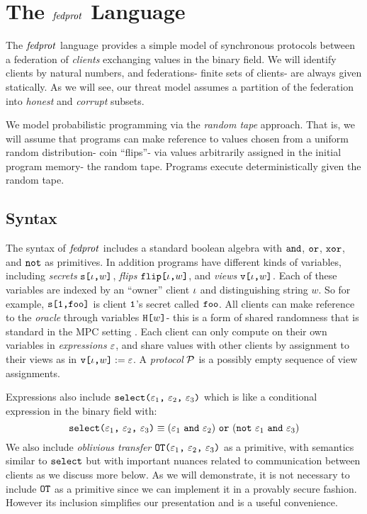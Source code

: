 \section{The $\mathit{fedprot}$ Language}

The $\mathit{fedprot}$ language provides a simple model of synchronous
protocols between a federation of \emph{clients} exchanging values in
the binary field. We will identify clients by natural numbers, and
federations- finite sets of clients- are always given statically.
As we will see, our threat model assumes a partition of the federation
into \emph{honest} and \emph{corrupt} subsets.

We model probabilistic programming via the \emph{random tape}
approach. That is, we will assume that programs can make reference to
values chosen from a uniform random distribution- coin ``flips''- via
values arbitrarily assigned in the initial program memory- the random
tape. Programs execute deterministically given the random tape.

\subsection{Syntax} The syntax of $\mathit{fedprot}$ includes a standard
boolean algebra with $\texttt{and}$, $\texttt{or}$, $\texttt{xor}$, and $\texttt{not}$ as
primitives. In addition programs have different kinds of variables,
including \emph{secrets} $\texttt{s[}\iota\texttt{,}w\texttt{]}$, \emph{flips}
$\texttt{flip[}\iota\texttt{,}w\texttt{]}$, and \emph{views} $\texttt{v[}\iota\texttt{,}w\texttt{]}$.  Each of these
variables are indexed by an ``owner'' client $\iota$ and distinguishing
string $w$. So for example, $\texttt{s[}\texttt{1}\texttt{,}\texttt{foo}\texttt{]}$ is client
$\texttt{1}$'s secret called $\texttt{foo}$. All clients can make reference
to the \emph{oracle} through variables $\texttt{H[}w\texttt{]}$- this is a form
of shared randomness that is standard in the MPC setting \cite{XXX}.
Each client can only compute on their own variables in
\emph{expressions} $\varepsilon$, and share values with other clients by
assignment to their views as in $\texttt{v[}\iota\texttt{,}w\texttt{]} := \varepsilon$.  A
\emph{protocol} $\mathcal{P}$ is a possibly empty sequence of view
assignments.

Expressions also include $\texttt{select(} \varepsilon_1 \texttt{,}\ \varepsilon_2 \texttt{,}\ \varepsilon_3 \texttt{)}$ which is
like a conditional expression in the binary field with:
$$
\select{\be_1}{\be_2}{\be_3} \equiv (\be_1\ \eand\ \be_2)\ \eor\ (\enot\ \be_1\ \eand\ \be_3)
$$
We also include \emph{oblivious transfer} $\texttt{OT(} \varepsilon_1 \texttt{,}\ \varepsilon_2 \texttt{,}\ \varepsilon_3 \texttt{)}$ as a primitive,
with semantics similar to $\texttt{select}$ but with important nuances
related to communication between clients as we discuss more below.
As we will demonstrate, it is not necessary to include $\texttt{OT}$
as a primitive since we can implement it in a provably secure
fashion. However its inclusion simplifies our presentation and is a useful
convenience.

